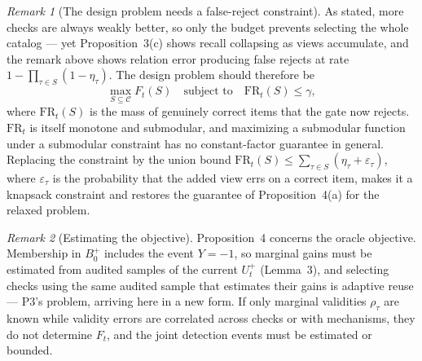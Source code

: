 \documentclass[11pt]{article}
\theoremstyle{remark}
\newtheorem*{remark}{Remark}
\newcommand{\Up}{U^{+}}
\begin{document}
\begin{remark}[The design problem needs a false-reject constraint]
As stated, more checks are always weakly better, so only the budget prevents selecting the whole catalog --- yet Proposition~3(c) shows recall collapsing as views accumulate, and the remark above shows relation error producing false rejects at rate $1-\prod_{\tau\in S}(1-\eta_\tau)$. The design problem should therefore be
\[
\max_{S\subseteq\mathcal{C}} F_t(S)\quad\text{subject to}\quad \mathrm{FR}_t(S)\le\gamma,
\]
where $\mathrm{FR}_t(S)$ is the mass of genuinely correct items that the gate now rejects. $\mathrm{FR}_t$ is itself monotone and submodular, and maximizing a submodular function under a submodular constraint has no constant-factor guarantee in general. Replacing the constraint by the union bound $\mathrm{FR}_t(S)\le\sum_{\tau\in S}(\eta_\tau+\varepsilon_\tau)$, where $\varepsilon_\tau$ is the probability that the added view errs on a correct item, makes it a knapsack constraint and restores the guarantee of Proposition~4(a) for the relaxed problem.
\end{remark}

\begin{remark}[Estimating the objective]
Proposition~4 concerns the oracle objective. Membership in $B_0^+$ includes the event $Y=-1$, so marginal gains must be estimated from audited samples of the current $\Up_t$ (Lemma~3), and selecting checks using the same audited sample that estimates their gains is adaptive reuse --- P3's problem, arriving here in a new form. If only marginal validities $\rho_\tau$ are known while validity errors are correlated across checks or with mechanisms, they do not determine $F_t$, and the joint detection events must be estimated or bounded.
\end{remark}
\end{document}
